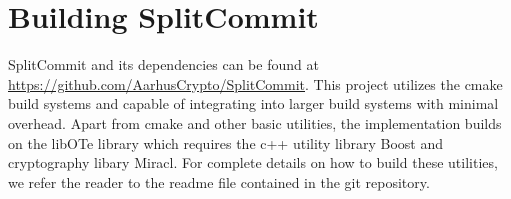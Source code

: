 \section{Building SplitCommit}

SplitCommit and its dependencies can be found at \url{https://github.com/AarhusCrypto/SplitCommit}. This project utilizes the cmake build systems and capable of integrating into larger build systems with minimal overhead. Apart from cmake and other basic utilities, the implementation builds on the libOTe\cite{libOTe} library which requires the c++ utility library Boost\cite{boost} and cryptography libary Miracl\cite{miracl}. For complete details on how to build these utilities, we refer the reader to the readme file contained in the git repository.

